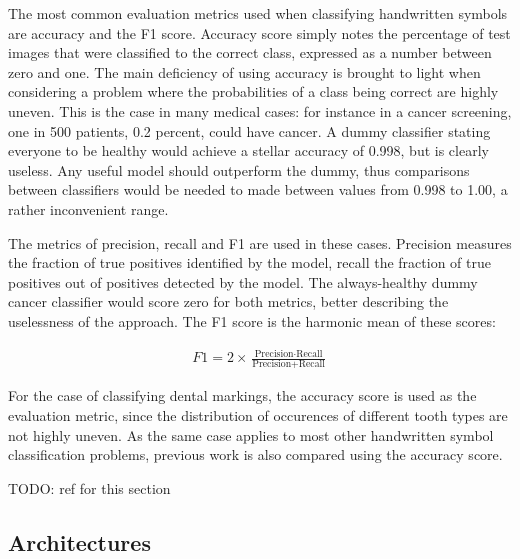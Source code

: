 \documentclass{article}
\begin{document}
The most common evaluation metrics used when classifying handwritten symbols are accuracy and the F1 score.
Accuracy score simply notes the percentage of test images that were classified to the correct class, expressed 
as a number between zero and one. The main deficiency of using accuracy is brought to light when 
considering a problem where the probabilities of a class being correct are highly uneven. This is the case in many 
medical cases: for instance in a cancer screening, one in 500 patients, 0.2 percent, could have cancer.
A dummy classifier stating everyone to be healthy would achieve a stellar accuracy of 0.998, but is clearly useless.
Any useful model should outperform the dummy, thus comparisons between classifiers would be needed to made 
between values from 0.998 to 1.00, a rather inconvenient range.

The metrics of precision, recall and F1 are used in these cases. Precision measures the 
fraction of true positives identified by the model, recall the fraction of true positives out 
of positives detected by the model. The always-healthy dummy cancer classifier would score zero 
for both metrics, better describing the uselessness of the approach. The F1 score is the harmonic mean of these 
scores:

\begin{align}
    F1 = 2 \times \frac{\text{Precision} \cdot \text{Recall}}{\text{Precision} + \text{Recall}}
\end{align}

For the case of classifying dental markings, the accuracy score is used as the evaluation metric, 
since the distribution of occurences of different tooth types are not highly uneven.
As the same case applies to most other handwritten symbol classification problems, previous work is 
also compared using the accuracy score.

TODO: ref for this section

\subsection{Architectures}
\end{document}
